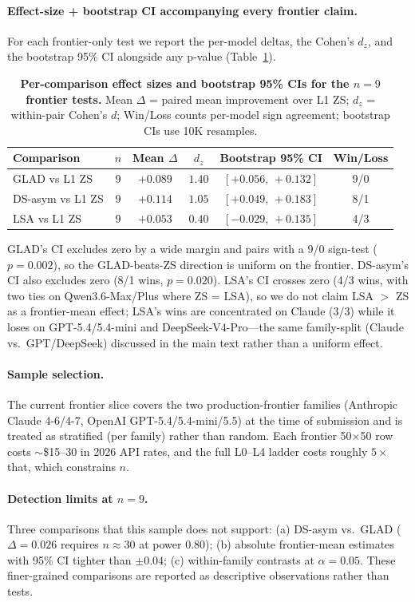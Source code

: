 \documentclass[11pt]{article}
\begin{document}
\paragraph{Effect-size + bootstrap CI accompanying every frontier claim.} For each frontier-only test we report the per-model deltas, the Cohen's $d_z$, and the bootstrap 95\% CI alongside any p-value (Table~\ref{tab:effect_sizes}).
\begin{table}[h]
\centering
\small
\caption{\textbf{Per-comparison effect sizes and bootstrap 95\% CIs for the $n{=}9$ frontier tests.} Mean $\Delta$ = paired mean improvement over L1 ZS; $d_z$ = within-pair Cohen's $d$; Win/Loss counts per-model sign agreement; bootstrap CIs use 10K resamples.}
\label{tab:effect_sizes}
\begin{tabular}{l c c c c c}
\toprule
Comparison & $n$ & Mean $\Delta$ & $d_z$ & Bootstrap 95\% CI & Win/Loss \\
\midrule
GLAD vs L1 ZS    & 9 & $+0.089$ & $1.40$ & $[+0.056,\,+0.132]$ & 9/0 \\
DS-asym vs L1 ZS & 9 & $+0.114$ & $1.05$ & $[+0.049,\,+0.183]$ & 8/1 \\
LSA vs L1 ZS     & 9 & $+0.053$ & $0.40$ & $[-0.029,\,+0.135]$ & 4/3 \\
\bottomrule
\end{tabular}
\end{table}
GLAD's CI excludes zero by a wide margin and pairs with a 9/0 sign-test ($p=0.002$), so the GLAD-beats-ZS direction is uniform on the frontier. DS-asym's CI also excludes zero (8/1 wins, $p=0.020$). LSA's CI crosses zero (4/3 wins, with two ties on Qwen3.6-Max/Plus where ZS = LSA), so we do not claim LSA $>$ ZS as a frontier-mean effect; LSA's wins are concentrated on Claude (3/3) while it loses on GPT-5.4/5.4-mini and DeepSeek-V4-Pro---the same family-split (Claude vs.\ GPT/DeepSeek) discussed in the main text rather than a uniform effect.

\paragraph{Sample selection.} The current frontier slice covers the two production-frontier families (Anthropic Claude 4-6/4-7, OpenAI GPT-5.4/5.4-mini/5.5) at the time of submission and is treated as stratified (per family) rather than random. Each frontier 50$\times$50 row costs $\sim$\$15--30 in 2026 API rates, and the full L0--L4 ladder costs roughly $5\times$ that, which constrains $n$.

\paragraph{Detection limits at $n=9$.} Three comparisons that this sample does not support: (a) DS-asym vs.\ GLAD ($\Delta=0.026$ requires $n\approx 30$ at power 0.80); (b) absolute frontier-mean estimates with 95\% CI tighter than $\pm 0.04$; (c) within-family contrasts at $\alpha{=}0.05$. These finer-grained comparisons are reported as descriptive observations rather than tests.
\end{document}
